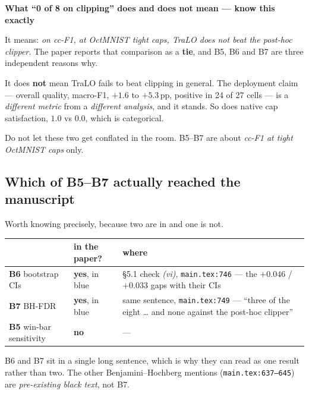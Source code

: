 \documentclass[11pt,a4paper]{article}
\newenvironment{callout}[1]
  {\par\medskip\noindent\begin{lrbox}{\calloutbox}%
   \begin{minipage}{\dimexpr\linewidth-20pt\relax}%
   \textbf{#1}\par\smallskip}
  {\end{minipage}\end{lrbox}%
   \setlength{\fboxsep}{10pt}%
   \colorbox{boxgrey}{\usebox{\calloutbox}}\par\medskip}
\begin{document}
\begin{callout}{What ``0 of 8 on clipping'' does and does not mean --- know this exactly}
It means: \emph{on cc-F1, at OctMNIST tight caps, TraLO does not beat the post-hoc clipper.}
The paper reports that comparison as a \textbf{tie}, and B5, B6 and B7 are three independent
reasons why.

\smallskip
It does \textbf{not} mean TraLO fails to beat clipping in general. The deployment claim ---
overall quality, macro-F1, $+1.6$ to $+5.3$\,pp, positive in 24 of 27 cells --- is a
\emph{different metric} from a \emph{different analysis}, and it stands. So does native cap
satisfaction, $1.0$ vs $0.0$, which is categorical.

\smallskip
Do not let these two get conflated in the room. B5--B7 are about \emph{cc-F1 at tight
OctMNIST caps} only.
\end{callout}

\subsection{Which of B5--B7 actually reached the manuscript}
Worth knowing precisely, because two are in and one is not.

\begin{center}\small
\begin{tabular}{llp{6.4cm}}
\toprule
& in the paper? & where \\
\midrule
\textbf{B6} bootstrap CIs & \textbf{yes}, in blue & \S5.1 check \emph{(vi)},
\texttt{main.tex:746} --- the $+0.046$ / $+0.033$ gaps with their CIs \\
\textbf{B7} BH-FDR        & \textbf{yes}, in blue & same sentence,
\texttt{main.tex:749} --- ``three of the eight \ldots{} and none against the post-hoc
clipper'' \\
\textbf{B5} win-bar sensitivity & \textbf{no} & --- \\
\bottomrule
\end{tabular}
\end{center}

\noindent B6 and B7 sit in a single long sentence, which is why they can read as one
result rather than two. The other Benjamini--Hochberg mentions (\texttt{main.tex:637--645})
are \emph{pre-existing black text}, not B7.
\end{document}
